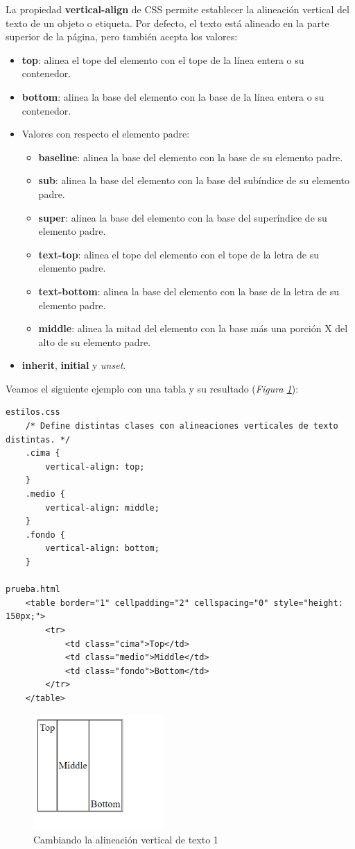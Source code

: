 La propiedad \textbf{vertical-align} de CSS permite establecer la alineación vertical del texto de un objeto o etiqueta. Por defecto, el texto está alineado en la parte superior de la página, pero también acepta los valores:
\begin{itemize}
    \item \textbf{top}: alinea el tope del elemento con el tope de la línea entera o su contenedor.
    \item \textbf{bottom}: alinea la base del elemento con la base de la línea entera o su contenedor.
    \item Valores con respecto el elemento padre:
    \begin{itemize}
        \item \textbf{baseline}: alinea la base del elemento con la base de su elemento padre.
        \item \textbf{sub}: alinea la base del elemento con la base del subíndice de su elemento padre.
        \item \textbf{super}: alinea la base del elemento con la base del superíndice de su elemento padre.
        \item \textbf{text-top}: alinea el tope del elemento con el tope de la letra de su elemento padre.
        \item \textbf{text-bottom}: alinea la base del elemento con la base de la letra de su elemento padre.
        \item \textbf{middle}: alinea la mitad del elemento con la base más una porción X del alto de su elemento padre.
    \end{itemize}
    \item \textbf{inherit}, \textbf{initial} y \textit{unset}.
\end{itemize}

Veamos el siguiente ejemplo con una tabla y su resultado (\textit{Figura \ref{fig: 9}}):
\begin{lstlisting}
estilos.css
    /* Define distintas clases con alineaciones verticales de texto distintas. */
    .cima {
        vertical-align: top;
    }
    .medio {
        vertical-align: middle;
    }
    .fondo {
        vertical-align: bottom;
    }

prueba.html
    <table border="1" cellpadding="2" cellspacing="0" style="height: 150px;">
        <tr>
            <td class="cima">Top</td>
            <td class="medio">Middle</td>
            <td class="fondo">Bottom</td>
        </tr>
    </table>
\end{lstlisting}
\begin{figure}[H]
    \centering
    \caption{Cambiando la alineación vertical de texto 1}
    \label{fig: 9}
    \includegraphics[width=5cm]{ss/fuentes-align-v1.png}
\end{figure}

